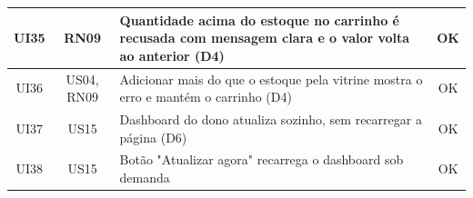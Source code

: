 \begin{longtable}{|c|c|p{9.4cm}|c|}
UI35 & RN09 & Quantidade acima do estoque no carrinho é recusada com mensagem clara e o valor volta ao anterior (D4) & \cellcolor{green!20}OK \\ \hline
UI36 & US04, RN09 & Adicionar mais do que o estoque pela vitrine mostra o erro e mantém o carrinho (D4) & \cellcolor{green!20}OK \\ \hline
UI37 & US15 & Dashboard do dono atualiza sozinho, sem recarregar a página (D6) & \cellcolor{green!20}OK \\ \hline
UI38 & US15 & Botão "Atualizar agora" recarrega o dashboard sob demanda & \cellcolor{green!20}OK \\ \hline
\end{longtable}\normalsize